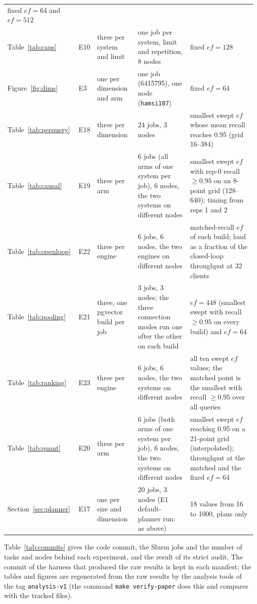 \documentclass[sigconf, nonacm]{acmart}
\begin{document}
\begin{table}[t]
\begin{tabular}{p{}p{}p{}p{}p{}}
      fixed $ef=64$ and $ef=512$ \\
    Table~\ref{tab:caps} & E10 & three per system and limit & one job per system, limit and
      repetition, 8 nodes & fixed $ef=128$ \\
    Figure~\ref{fig:dims} & E3 & one per dimension and arm & one job (6415795), one node
      (\texttt{hamsi107}) & fixed $ef=64$ \\
    Table~\ref{tab:perquery} & E18 & three per dimension & 24 jobs, 3 nodes & smallest swept $ef$
      whose mean recall reaches 0.95 (grid 16--384) \\
    Table~\ref{tab:causal} & E19 & three per arm & 6 jobs (all arms of one system per job), 6 nodes,
      the two systems on different nodes & smallest swept $ef$ with rep-0 recall $\ge 0.95$ on an 8-point grid
      (128--640); timing from reps 1 and 2 \\
    Table~\ref{tab:openloop} & E22 & three per engine & 6 jobs, 6 nodes, the two engines on different nodes & matched-recall $ef$ of each build;
      load as a fraction of the closed-loop throughput at 32 clients \\
    Table~\ref{tab:pooling} & E21 & three, one pgvector build per job & 3 jobs, 3 nodes; the three connection modes run
      one after the other on each build & $ef=448$ (smallest swept with recall $\ge 0.95$ on every build) and $ef=64$ \\
    Table~\ref{tab:ranking} & E23 & three per engine & 6 jobs, 6 nodes, the two systems on different nodes &
      all ten swept $ef$ values; the matched point is the smallest with recall $\ge 0.95$ over all queries \\
    Table~\ref{tab:quant} & E20 & three per arm & 6 jobs (both arms of one system per job), 6 nodes,
      the two systems on different nodes & smallest swept $ef$ reaching 0.95 on a 21-point grid
      (interpolated); throughput at the matched and the fixed $ef=64$ \\
    Section~\ref{sec:planner} & E17 & one per size and dimension & 20 jobs, 3 nodes (E1 default-planner
      run: as above) & 18 values from 16 to 1000, plans only \\
    \bottomrule
  \end{tabular}
\end{table}

Table~\ref{tab:commits} gives the code commit, the Slurm jobs and the number of tasks and nodes behind each experiment, and the result of its strict audit.
The commit of the harness that produced the raw results is kept in each manifest; the tables and figures are regenerated from the raw results by the analysis
tools of the tag \texttt{analysis-v1} (the command \texttt{make verify-paper} does this and compares with the tracked files).
\end{document}
